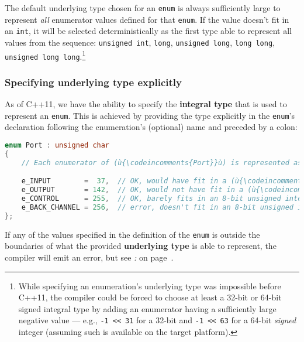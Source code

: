 \noindent The default underlying type chosen for an \texttt{enum} is always
sufficiently large to represent \emph{all} enumerator values defined for
that \texttt{enum}. If the value doesn't fit in an \texttt{int}, it will
be selected deterministically as the first type able to represent all
values from the sequence: \texttt{unsigned}~\texttt{int}, \texttt{long},
\texttt{unsigned}~\texttt{long}, \texttt{long}~\texttt{long},
\texttt{unsigned}~\texttt{long}~\texttt{long}.{\cprotect\footnote{While
specifying an enumeration's underlying type was impossible before
C++11, the compiler could be forced to choose at least a 32-bit or
64-bit signed integral type by adding an enumerator having a
sufficiently large negative value --- e.g.,
\texttt{-1}~\texttt{<<}~\texttt{31} for a 32-bit and
\texttt{-1}~\texttt{<<}~\texttt{63} for a 64-bit \emph{signed} integer
  (assuming such is available on the target platform).}}

\subsubsection[Specifying underlying type explicitly]{Specifying underlying type explicitly}\label{specifying-underlying-type-explicitly}

As of C++11, we have the ability to specify the \textbf{integral type}
that is used to represent an \texttt{enum}. This is achieved by
providing the type explicitly in the \texttt{enum}'s declaration
following the enumeration's (optional) name and preceded by a colon:

\begin{lstlisting}[language=C++]
enum Port : unsigned char
{
    // Each enumerator of (ù{\codeincomments{Port}}ù) is represented as an (ù{\codeincomments{unsigned char}}ù) type.

    e_INPUT        =  37,  // OK, would have fit in a (ù{\codeincomments{signed char}}ù) too
    e_OUTPUT       = 142,  // OK, would not have fit in a (ù{\codeincomments{signed char}}ù)
    e_CONTROL      = 255,  // OK, barely fits in an 8-bit unsigned integer
    e_BACK_CHANNEL = 256,  // error, doesn't fit in an 8-bit unsigned integer
};
\end{lstlisting}

\noindent If any of the values specified in the definition of the \texttt{enum} is
outside the boundaries of what the provided \textbf{underlying type} is
able to represent, the compiler will emit an error, but see \textit{: } on page~\pageref{subtleties-of-integral-promotion}.

